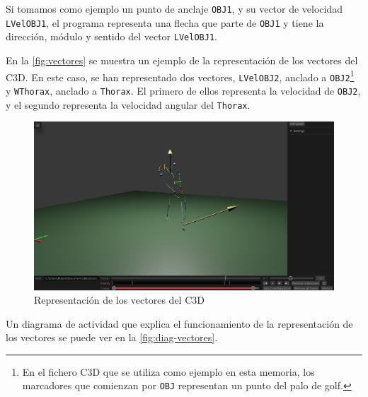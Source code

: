 Si tomamos como ejemplo un punto de anclaje \texttt{OBJ1}, y su vector de velocidad \texttt{LVelOBJ1}, el programa representa una flecha que parte de \texttt{OBJ1} y tiene la dirección, módulo y sentido del vector \texttt{LVelOBJ1}.

En la \autoref{fig:vectores} se muestra un ejemplo de la representación de los vectores del \ac{C3D}. En este caso, se han representado dos vectores, \texttt{LVelOBJ2}, anclado a \texttt{OBJ2}\footnote{En el fichero \ac{C3D} que se utiliza como ejemplo en esta memoria, los marcadores que comienzan por \texttt{OBJ} representan un punto del palo de golf.} y \texttt{WThorax}, anclado a \texttt{Thorax}. El primero de ellos representa la velocidad de \texttt{OBJ2}, y el segundo representa la velocidad angular del \texttt{Thorax}.

\begin{figure}[H]
  \centering
  \includegraphics[width=\textwidth]{imagenes/vectores.png}
  \caption{Representación de los vectores del \acs{C3D}}
  \label{fig:vectores}
\end{figure}

Un diagrama de actividad que explica el funcionamiento de la representación de los vectores se puede ver en la \autoref{fig:diag-vectores}.

